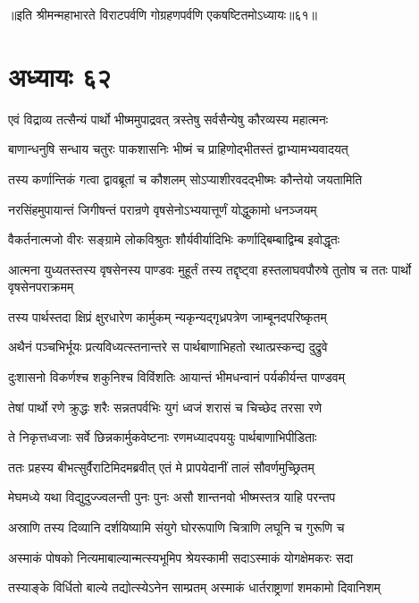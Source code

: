 ॥इति श्रीमन्महाभारते विराटपर्वणि गोग्रहणपर्वणि एकषष्टितमोऽध्यायः॥६१॥

\chapter{अध्यायः ६२}

\twolineshloka
{एवं विद्राव्य तत्सैन्यं पार्थो भीष्ममुपाद्रवत्}
{त्रस्तेषु सर्वसैन्येषु कौरव्यस्य महात्मनः}


\twolineshloka
{बाणान्धनुषि सन्धाय चतुरः पाकशासनिः}
{भीष्मं च प्राहिणोद्भीतस्तं द्वाभ्यामभ्यवादयत्}


\twolineshloka
{तस्य कर्णान्तिकं गत्वा द्वावब्रूतां च कौशलम्}
{सोऽप्याशीरवदद्भीष्मः कौन्तेयो जयतामिति}


\twolineshloka
{नरसिंहमुपायान्तं जिगीषन्तं परान्रणे}
{वृषसेनोऽभ्ययात्तूर्णं योद्धुकामो धनञ्जयम्}


\twolineshloka
{वैकर्तनात्मजो वीरः सङ्ग्रामे लोकविश्रुतः}
{शौर्यवीर्यादिभिः कर्णाद्बिम्बाद्विम्ब इवोद्धृतः}


\threelineshloka
{आत्मना युध्यतस्तस्य वृषसेनस्य पाण्डवः}
{मुहूर्तं तस्य तद्दृष्ट्वा हस्तलाघवपौरुषे}
{तुतोष च ततः पार्थो वृषसेनपराक्रमम्}


\twolineshloka
{तस्य पार्थस्तदा क्षिप्रं क्षुरधारेण कार्मुकम्}
{न्यकृन्यद्गृध्रपत्रेण जाम्बूनदपरिष्कृतम्}


\twolineshloka
{अथैनं पञ्चभिर्भूयः प्रत्यविध्यत्स्तनान्तरे}
{स पार्थबाणाभिहतो रथात्प्रस्कन्द्य दुद्रुवे}


\twolineshloka
{दुःशासनो विकर्णश्च शकुनिश्च विविंशतिः}
{आयान्तं भीमधन्वानं पर्यकीर्यन्त पाण्डवम्}


\twolineshloka
{तेषां पार्थो रणे क्रुद्धः शरैः सन्नतपर्वभिः}
{युगं ध्वजं शरासं च चिच्छेद तरसा रणे}


\twolineshloka
{ते निकृत्तध्वजाः सर्वे छिन्नकार्मुकवेष्टनाः}
{रणमध्यादपययुः पार्थबाणाभिपीडिताः}


\twolineshloka
{ततः प्रहस्य बीभत्सुर्वैराटिमिदमब्रवीत्}
{एतं मे प्रापयेदानीं तालं सौवर्णमुच्छ्रितम्}


\twolineshloka
{मेघमध्ये यथा विद्युदुज्ज्वलन्ती पुनः पुनः}
{असौ शान्तनवो भीष्मस्तत्र याहि परन्तप}


\twolineshloka
{अस्राणि तस्य दिव्यानि दर्शयिष्यामि संयुगे}
{घोररूपाणि चित्राणि लघूनि च गुरूणि च}


\twolineshloka
{अस्माकं पोषको नित्यमाबाल्यान्मत्स्यभूमिप}
{श्रेयस्कामी सदाऽस्माकं योगक्षेमकरः सदा}


\twolineshloka
{तस्याङ्के विर्धितो बाल्ये तद्योत्स्येऽनेन साम्प्रतम्}
{अस्माकं धार्तराष्ट्राणां शमकामो दिवानिशम्}



